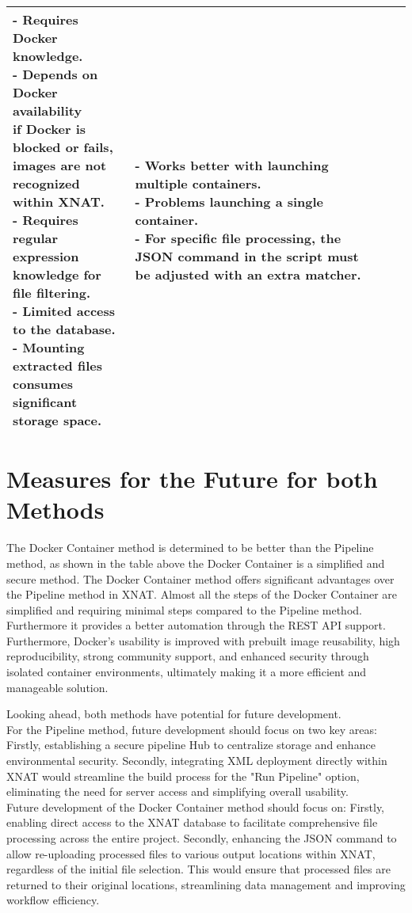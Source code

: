 \begin{table}[htbp]
\begin{tabular}{|p{3cm}|p{3cm}|p{5cm}|p{4cm}|}
{- Requires Docker knowledge. \\
- Depends on Docker availability \\if Docker is blocked or fails, \\images are not recognized\\ within XNAT. \\
- Requires regular expression\\ knowledge for file filtering. \\
- Limited access to the database. \\
- Mounting extracted files \\ consumes significant \\storage space.\\
}
&
\parbox[t]{4cm}{
- Works better with launching multiple containers. \\
- Problems launching a single container. \\
- For specific file processing, the JSON command in the script must be adjusted with an extra matcher.
} \\
\hline
\end{tabular}
\label{tab:docker_pipeline}
\end{table}


\section{Measures for the Future for both Methods}

The Docker Container method is determined to be better than the Pipeline method, as shown in the table above the Docker Container is a simplified and secure method.  
The Docker Container method offers significant advantages over the Pipeline method in XNAT.
Almost all the steps of the Docker Container are simplified and requiring minimal steps compared to the Pipeline method. Furthermore it provides a better automation through the REST API support.  Furthermore, Docker's usability is improved with prebuilt image reusability, high reproducibility, strong community support, and enhanced security through isolated container environments, ultimately making it a more efficient and manageable solution.

Looking ahead, both methods have potential for future development.\\
For the Pipeline method, future development should focus on two key areas: Firstly, establishing a secure pipeline Hub to centralize storage and enhance environmental security. Secondly, integrating XML deployment directly within XNAT would streamline the build process for the "Run Pipeline" option, eliminating the need for server access and simplifying overall usability.\\
Future development of the Docker Container method should focus on: Firstly, enabling direct access to the XNAT database to facilitate comprehensive file processing across the entire project. Secondly, enhancing the JSON command to allow re-uploading processed files to various output locations within XNAT, regardless of the initial file selection. This would ensure that processed files are returned to their original locations, streamlining data management and improving workflow efficiency.
